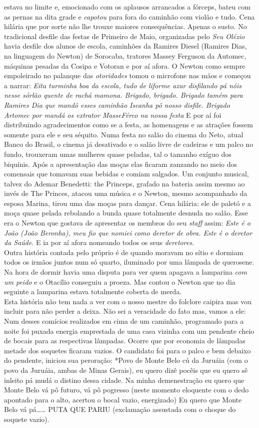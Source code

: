 \documentclass[12pt,brazil,]{book}
\begin{document}
estava no limite e, emocionado com os aplausos arrancados a fórceps,
bateu com as pernas na dita grade e \emph{capotou} para fora do caminhão
com violão e tudo. Cena hilária que por sorte não lhe trouxe maiores
consequências. Apenas o susto. No tradicional desfile das festas de
Primeiro de Maio, organizadas pelo \emph{Seu Olézio} havia desfile dos
alunos de escola, caminhões da Ramires Diesel (Ramires Dias, na
linguagem do Newton) de Sorocaba, tratores Massey Ferguson da Automec,
máquinas pesadas da Cosipa e Votoran e por aí afora. O Newton como
sempre empoleirado no palanque das \emph{otoridades} tomou o microfone
nas mãos e começou a narrar: \emph{Eita turminha boa da escola, tudo de
liforme azur disfilando pá nóis nesse sórlão quente de rachá mamona.
Brigado, brigado. Brigado tamém para Ramires Dia que mandô esses
caminhão Iscanha pô nosso disfile. Brigado Artomec por mandá os extrator
MasseFérco na nossa festa} E por aí foi distribuindo agradecimentos como
se a festa, as homenagens e as atrações fossem somente para ele e seu
séquito. Numa festa no salão do cinema do Neto, atual Banco do Brasil, o
cinema já desativado e o salão livre de cadeiras e um palco no fundo,
trouxeram umas mulheres quase peladas, tal o tamanho exíguo dos
biquínis. Após a apresentação das moças elas ficaram zanzando no meio
dos comensais que tomavam suas bebidas e comiam salgados. Um conjunto
musical, talvez do Ademar Benedetti: the Princeps, grafado na bateria
assim mesmo ao invés de The Princes, atacou uma música e o Newton, mesmo
acompanhado da esposa Marina, tirou uma das moças para dançar. Cena
hilária: ele de paletó e a moça quase pelada rebolando a bunda quase
totalmente desnuda no salão. Esse era o Newton que gostava de apresentar
os membros do seu \emph{staff} assim: \emph{Este é o João (João
Beronha), meu fio que nomiei como deretor de obra. Este é o deretor da
Saúde}. E ia por aí afora nomeando todos os seus \emph{deretores}.\\
Outra história contada pelo próprio é de quando moravam no sítio e
dormiam todos os irmãos juntos num só quarto, iluminado por uma lâmpada
de querosene. Na hora de dormir havia uma disputa para ver quem apagava
a lamparina \emph{com um peido} e o Otacílio conseguiu a proeza. Mas
contou o Newton que no dia seguinte a lamparina estava totalmente
coberta de merda.\\
Esta história não tem nada a ver com o nosso mestre do folclore caipira
mas vou incluir para não perder a deixa. Não sei a veracidade do fato
mas, vamos a ele: Num desses comícios realizados em cima de um caminhão,
programado para a noite foi puxada energia emprestada de uma casa
vizinha com um pendente cheio de bocais para as respectivas lâmpadas.
Ocorre que por economia de lâmpadas metade dos soquetes ficaram vazios.
O candidato foi para o palco e bem debaixo do pendente, iniciou sua
peroração: *Povo de Monte Belo cú da Juruáia (com o povo da Juruáia,
ambas de Minas Gerais), eu quero dizê pocêis que eu quero sê inleito pá
mudá o distino dessa cidade. Na minha demenestração eu quero que Monte
Belo vá pô futuro, vá pô pogresso (neste momento eloquente com o dedo
apontado para o alto, acertou o bocal vazio, energizado) Eu quero que
Monte Belo vá pá\ldots{}\ldots{} PUTA QUE PARIU (exclamação assustada
com o choque do soquete vazio).
\end{document}
